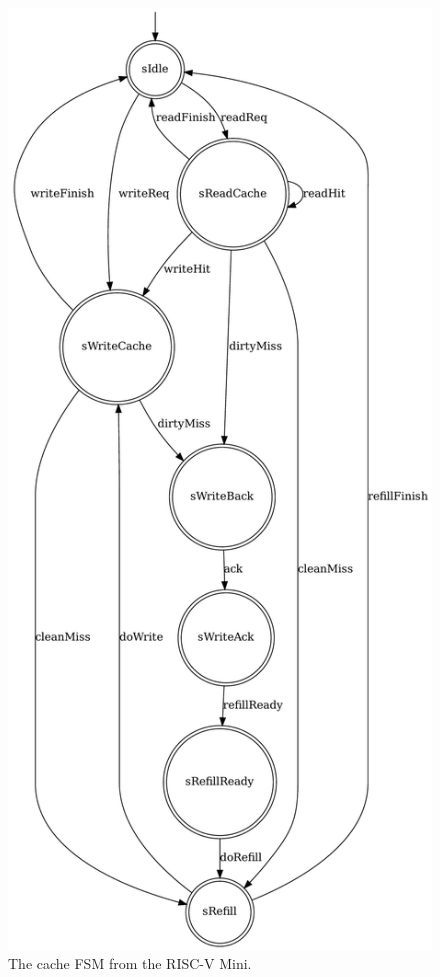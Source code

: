 \documentclass[sigplan,anonymous, review]{acmart}
\begin{document}
\begin{figure}
    \centering
    \includegraphics[width=0.7\linewidth]{figures/cacheFSM.pdf}
    \caption{The cache FSM from the RISC-V Mini.}
    \label{fig:cacheBefore}
\end{figure}
\end{document}
